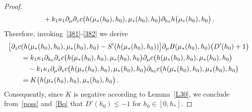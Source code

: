 \documentclass[10pt,a4paper]{amsart}
\begin{document}
\begin{proof}
\begin{align*}
&\quad +k_1\kappa_1 \partial_{\mu}\partial_z {\rm c}\big(h(\mu_*(h_0),h_0),\mu_*(h_0),h_0\big) \partial_{h_0} h\big(\mu_*(h_0),h_0\big)\,.
\end{align*}
Therefore, invoking~\eqref{381}-\eqref{382} we derive
\begin{align*}
\big[\partial_z{\rm c}&(h(\mu_*(h_0),h_0),\mu_*(h_0),h_0)-S'(h(\mu_*(h_0),h_0)) \big]\partial_{\mu}B(\mu_*(h_0),h_0)\big(D'(h_0)+1\big)\\
&=k_1\kappa_1 \partial_{h_0}\partial_z {\rm c}\big(h(\mu_*(h_0),h_0),\mu_*(h_0),h_0\big) \partial_{\mu} {\rm c}\big(h(\mu_*(h_0),h_0),\mu_*(h_0),h_0\big)\\
&\quad -k_1\kappa_1 \partial_{\mu}\partial_z {\rm c}\big(h(\mu_*(h_0),h_0),\mu_*(h_0),h_0\big) \partial_{h_0} {\rm c}\big(h(\mu_*(h_0),h_0),\mu_*(h_0),h_0\big)\\
&=K\big(h(\mu_*(h_0),h_0),\mu_*(h_0),h_0\big)\,.
\end{align*}
Consequently, since $K$ is negative according to Lemma~\ref{L30}, we conclude from~\eqref{poss} and~\eqref{Bq} that $D'(h_0)\le -1$ for $h_0\in [0,h_*]$.
\end{proof}
\end{document}
